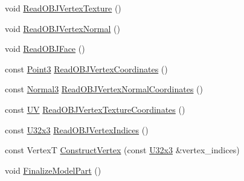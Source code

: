 \begin{DoxyCompactItemize}
void \mbox{\hyperlink{classmage_1_1rendering_1_1loader_1_1_o_b_j_reader_a91f53fd761c83c4135a3ef1882b8300d}{Read\+O\+B\+J\+Vertex\+Texture}} ()
\item 
void \mbox{\hyperlink{classmage_1_1rendering_1_1loader_1_1_o_b_j_reader_a1aafeda3894017fb9b3c6183ac272a34}{Read\+O\+B\+J\+Vertex\+Normal}} ()
\item 
void \mbox{\hyperlink{classmage_1_1rendering_1_1loader_1_1_o_b_j_reader_a58d5c4e4a5a82714567413b6e17a9ec7}{Read\+O\+B\+J\+Face}} ()
\item 
const \mbox{\hyperlink{structmage_1_1_point3}{Point3}} \mbox{\hyperlink{classmage_1_1rendering_1_1loader_1_1_o_b_j_reader_a2c5d954441d64b982d7a89df9171edbc}{Read\+O\+B\+J\+Vertex\+Coordinates}} ()
\item 
const \mbox{\hyperlink{structmage_1_1_normal3}{Normal3}} \mbox{\hyperlink{classmage_1_1rendering_1_1loader_1_1_o_b_j_reader_aa91768722fd418aeba3f12915e8e1525}{Read\+O\+B\+J\+Vertex\+Normal\+Coordinates}} ()
\item 
const \mbox{\hyperlink{structmage_1_1_u_v}{UV}} \mbox{\hyperlink{classmage_1_1rendering_1_1loader_1_1_o_b_j_reader_a3fdbcdecf40525631afc53ce6a6dba45}{Read\+O\+B\+J\+Vertex\+Texture\+Coordinates}} ()
\item 
const \mbox{\hyperlink{namespacemage_a1e9348414b777b1a460dc4f295bc87fc}{U32x3}} \mbox{\hyperlink{classmage_1_1rendering_1_1loader_1_1_o_b_j_reader_adf0996ca5d0339782382b46c14768b7f}{Read\+O\+B\+J\+Vertex\+Indices}} ()
\item 
const VertexT \mbox{\hyperlink{classmage_1_1rendering_1_1loader_1_1_o_b_j_reader_aa223ad518d2cdddd1c89a3f113356d77}{Construct\+Vertex}} (const \mbox{\hyperlink{namespacemage_a1e9348414b777b1a460dc4f295bc87fc}{U32x3}} \&vertex\+\_\+indices)
\item 
void \mbox{\hyperlink{classmage_1_1rendering_1_1loader_1_1_o_b_j_reader_a4c76ddb64f1bdae2ee1a91cd1b97cdde}{Finalize\+Model\+Part}} ()
\end{DoxyCompactItemize}
